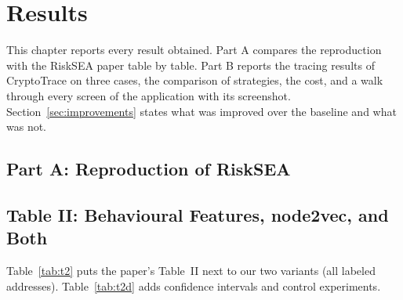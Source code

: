 \chapter{Results}
\label{ch:results}

This chapter reports every result obtained. Part A compares the reproduction with the RiskSEA paper table by table. Part B reports the tracing results of CryptoTrace on three cases, the comparison of strategies, the cost, and a walk through every screen of the application with its screenshot. Section~\ref{sec:improvements} states what was improved over the baseline and what was not.

\section*{Part A: Reproduction of RiskSEA}

\section{Table II: Behavioural Features, node2vec, and Both}
\label{sec:t2}
Table~\ref{tab:t2} puts the paper's Table~II next to our two variants (all \NumLabeled{} labeled addresses). Table~\ref{tab:t2d} adds confidence intervals and control experiments.
\begin{table}[H]
\centering\footnotesize\singlespacing

\caption{Precision (P), recall (R) and F$_1$ at threshold 0.5. Paper values are from its Table~II. Variant A: labeled addresses are in the core; variant B: labeled addresses receive propagated embeddings only.}
\label{tab:t2}
\end{table}
\begin{table}[H]
\centering\scriptsize\singlespacing
\setlength{\tabcolsep}{3pt}
\caption{F$_1$ and PR-AUC with 95\% confidence intervals over 5 splits. ``Flag removed'' drops the has-embedding indicator; ``covered only'' keeps only addresses that have an embedding; ``no miners'' drops miners from the good class (481 bad, 127 good).}
\label{tab:t2d}
\end{table}
